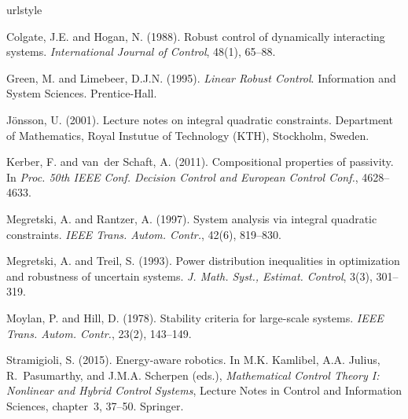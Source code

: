 \documentclass{ifacconf}
\theoremstyle{definition}
\begin{document}

%
\begin{thebibliography}{12}

\providecommand{\natexlab}[1]{#1}
\providecommand{\url}[1]{\texttt{#1}}
\providecommand{\urlprefix}{URL }
\expandafter\ifx\csname urlstyle\endcsname\relax
  \providecommand{\doi}[1]{doi:\discretionary{}{}{}#1}\else
  \providecommand{\doi}{doi:\discretionary{}{}{}\begingroup
  \urlstyle{rm}\Url}\fi

Colgate, J.E. and Hogan, N. (1988).
\newblock Robust control of dynamically interacting systems.
\newblock \emph{International Journal of Control}, 48(1), 65--88.

Green, M. and Limebeer, D.J.N. (1995).
\newblock \emph{Linear Robust Control}.
\newblock Information and System Sciences. Prentice-Hall.

J{\" o}nsson, U. (2001).
\newblock Lecture notes on integral quadratic constraints.
\newblock Department of Mathematics, Royal Instutue of Technology (KTH),
  Stockholm, Sweden.

Kerber, F. and van~der Schaft, A. (2011).
\newblock Compositional properties of passivity.
\newblock In \emph{Proc. 50th IEEE Conf. Decision Control and European Control
  Conf.}, 4628--4633.

Megretski, A. and Rantzer, A. (1997).
\newblock System analysis via integral quadratic constraints.
\newblock \emph{IEEE Trans. Autom. Contr.}, 42(6), 819--830.

Megretski, A. and Treil, S. (1993).
\newblock Power distribution inequalities in optimization and robustness of
  uncertain systems.
\newblock \emph{J. Math. Syst., Estimat. Control}, 3(3), 301--319.

Moylan, P. and Hill, D. (1978).
\newblock Stability criteria for large-scale systems.
\newblock \emph{IEEE Trans. Autom. Contr.}, 23(2), 143--149.

Stramigioli, S. (2015).
\newblock Energy-aware robotics.
\newblock In M.K. Kamlibel, A.A. Julius, R.~Pasumarthy, and J.M.A. Scherpen
  (eds.), \emph{Mathematical Control Theory {I}: Nonlinear and Hybrid Control
  Systems}, Lecture Notes in Control and Information Sciences, chapter~3,
  37--50. Springer.


\end{thebibliography}
\end{document}
